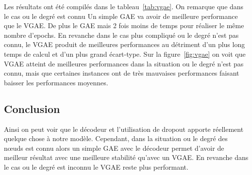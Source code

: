 \documentclass{article}
\begin{document}
Les résultats ont été compilés dans le tableau~\ref{tab:vgae}. 
On remarque que dans le cas ou le degré est connu Un simple GAE va avoir de meilleure performance que le VGAE.
 De plus le GAE mais 2 fois moins de temps pour réaliser le même nombre d'epochs. 
 En revanche dans le cas plus compliqué ou le degré n'est pas connu, 
 le VGAE produit de meilleures performances au détriment d'un plus long temps de calcul et d'un plus grand écart-type. 
 Sur la figure~\ref{fig:vgae} on voit que VGAE atteint de meilleures performances dans la situation ou le degré n'est pas connu,
 mais que certaines instances ont de très mauvaises performances faisant baisser les performances moyennes.
\begin{table}[H]
    \captionsetup{justification=centering}
    \caption{Résultats de l'utilisation d'un GAE au lieu du VGAE. \\ \footnotesize Dans chaque case est indiquée la moyenne et l'écart-type au format : moyenne(écart-type)}
    \label{tab:vgae}
\end{table}
\subsection{Conclusion}
Ainsi on peut voir que le décodeur et l'utilisation de dropout apporte réellement quelque chose à notre modèle.
Cependant, dans la situation ou le degré des nœuds est connu alors un simple GAE avec le décodeur permet d'avoir de meilleur résultat avec une meilleure stabilité qu'avec un VGAE.
En revanche dans le cas ou le degré est inconnu le VGAE reste plus performant.
\end{document}
